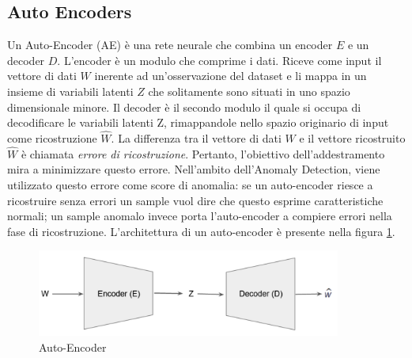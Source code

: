 \subsection{Auto Encoders}
Un Auto-Encoder (AE) \cite{aggarwal2015outlier} è una rete neurale che combina un encoder $E$ e un decoder $D$. L'encoder è un modulo che comprime i dati. Riceve come input il vettore di dati $W$ inerente ad un'osservazione del dataset e li mappa in un insieme di variabili latenti $Z$ che solitamente sono situati in uno spazio dimensionale minore. Il decoder è il secondo modulo il quale si occupa di decodificare le variabili latenti Z, rimappandole nello spazio originario di input come ricostruzione $\widehat{W}$. La differenza tra il vettore di dati $W$ e il vettore ricostruito $\widehat{W}$ è chiamata \textit{errore di ricostruzione}. Pertanto, l'obiettivo dell'addestramento mira a minimizzare questo errore. Nell'ambito dell'Anomaly Detection, viene utilizzato questo errore come score di anomalia: se un auto-encoder riesce a ricostruire senza errori un sample vuol dire che questo esprime caratteristiche normali; un sample anomalo invece porta l'auto-encoder a compiere errori nella fase di ricostruzione. L'architettura di un auto-encoder è presente nella figura \ref{ae}.
\begin{figure}[t]
	\centering
	\includegraphics[width=10cm, scale=1]{images/ae}
	\caption{Auto-Encoder}
	\label{ae}
\end{figure}
